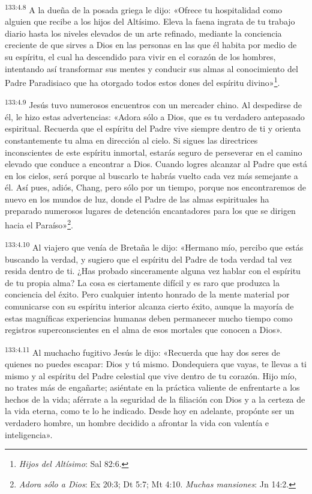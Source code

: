 \par 
\textsuperscript{133:4.8} A la dueña de la posada griega le dijo: «Ofrece tu hospitalidad como alguien que recibe a los hijos del Altísimo. Eleva la faena ingrata de tu trabajo diario hasta los niveles elevados de un arte refinado, mediante la conciencia creciente de que sirves a Dios en las personas en las que él habita por medio de su espíritu, el cual ha descendido para vivir en el corazón de los hombres, intentando así transformar sus mentes y conducir sus almas al conocimiento del Padre Paradisiaco que ha otorgado todos estos dones del espíritu divino»\footnote{\textit{Hijos del Altísimo}: Sal 82:6.}.

\par 
\textsuperscript{133:4.9} Jesús tuvo numerosos encuentros con un mercader chino. Al despedirse de él, le hizo estas advertencias: «Adora sólo a Dios, que es tu verdadero antepasado espiritual. Recuerda que el espíritu del Padre vive siempre dentro de ti y orienta constantemente tu alma en dirección al cielo. Si sigues las directrices inconscientes de este espíritu inmortal, estarás seguro de perseverar en el camino elevado que conduce a encontrar a Dios. Cuando logres alcanzar al Padre que está en los cielos, será porque al buscarlo te habrás vuelto cada vez más semejante a él. Así pues, adiós, Chang, pero sólo por un tiempo, porque nos encontraremos de nuevo en los mundos de luz, donde el Padre de las almas espirituales ha preparado numerosos lugares de detención encantadores para los que se dirigen hacia el Paraíso»\footnote{\textit{Adora sólo a Dios}: Ex 20:3; Dt 5:7; Mt 4:10. \textit{Muchas mansiones}: Jn 14:2.}.

\par 
\textsuperscript{133:4.10} Al viajero que venía de Bretaña le dijo: «Hermano mío, percibo que estás buscando la verdad, y sugiero que el espíritu del Padre de toda verdad tal vez resida dentro de ti. ¿Has probado sinceramente alguna vez hablar con el espíritu de tu propia alma? La cosa es ciertamente difícil y es raro que produzca la conciencia del éxito. Pero cualquier intento honrado de la mente material por comunicarse con su espíritu interior alcanza cierto éxito, aunque la mayoría de estas magníficas experiencias humanas deben permanecer mucho tiempo como registros superconscientes en el alma de esos mortales que conocen a Dios».

\par 
\textsuperscript{133:4.11} Al muchacho fugitivo Jesús le dijo: «Recuerda que hay dos seres de quienes no puedes escapar: Dios y tú mismo. Dondequiera que vayas, te llevas a ti mismo y al espíritu del Padre celestial que vive dentro de tu corazón. Hijo mío, no trates más de engañarte; asiéntate en la práctica valiente de enfrentarte a los hechos de la vida; aférrate a la seguridad de la filiación con Dios y a la certeza de la vida eterna, como te lo he indicado. Desde hoy en adelante, propónte ser un verdadero hombre, un hombre decidido a afrontar la vida con valentía e inteligencia».

